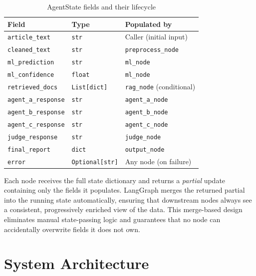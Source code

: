 \documentclass[12pt, a4paper]{article}
\begin{document}
\begin{table}[H]
\centering
\caption{AgentState fields and their lifecycle}
\label{tab:state}
\begin{tabular}{@{}llp{5.5cm}@{}}
\toprule
\textbf{Field} & \textbf{Type} & \textbf{Populated by} \\
\midrule
\texttt{article\_text}      & \texttt{str}           & Caller (initial input) \\
\texttt{cleaned\_text}      & \texttt{str}           & \texttt{preprocess\_node} \\
\texttt{ml\_prediction}     & \texttt{str}           & \texttt{ml\_node} \\
\texttt{ml\_confidence}     & \texttt{float}         & \texttt{ml\_node} \\
\texttt{retrieved\_docs}    & \texttt{List[dict]}    & \texttt{rag\_node} (conditional) \\
\texttt{agent\_a\_response} & \texttt{str}           & \texttt{agent\_a\_node} \\
\texttt{agent\_b\_response} & \texttt{str}           & \texttt{agent\_b\_node} \\
\texttt{agent\_c\_response} & \texttt{str}           & \texttt{agent\_c\_node} \\
\texttt{judge\_response}    & \texttt{str}           & \texttt{judge\_node} \\
\texttt{final\_report}      & \texttt{dict}          & \texttt{output\_node} \\
\texttt{error}              & \texttt{Optional[str]} & Any node (on failure) \\
\bottomrule
\end{tabular}
\end{table}

Each node receives the full state dictionary and returns a \emph{partial}
update containing only the fields it populates. LangGraph merges the
returned partial into the running state automatically, ensuring that
downstream nodes always see a consistent, progressively enriched view of
the data. This merge-based design eliminates manual state-passing logic
and guarantees that no node can accidentally overwrite fields it does not
own.


\section{System Architecture}
\end{document}
